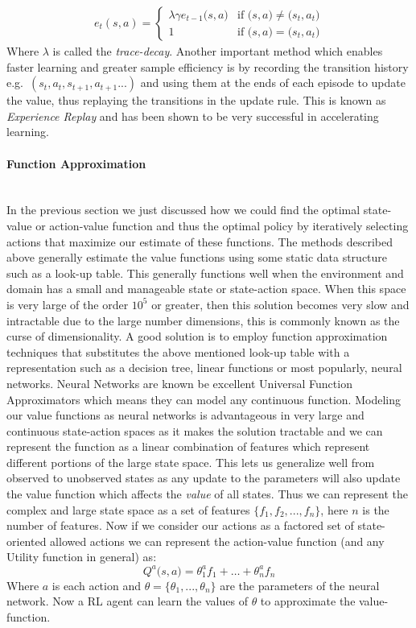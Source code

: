 \documentclass[14pt]{extarticle}
\newcommand{\myparagraph}[1]{\paragraph{#1}\mbox{}\\ \linebreak}
\numberwithin{equation}{section}
\begin{document}
	\begin{align}
	e_t(s,a) = \begin{cases}
	\lambda\gamma e_{t-1}\big(s,a\big) & \text{if }\big(s,a\big) \neq \big(s_t,a_t\big) \\    
	1 & \text{if }\big(s,a\big) = \big(s_t,a_t\big)
	\end{cases}
	\end{align}
	Where $\lambda$ is called the \textit{trace-decay}.
	Another important method which enables faster learning and greater sample efficiency is by recording the transition history e.g.\ $(s_t,a_t,s_{t+1},a_{t+1}...)$ and using them at the ends of each episode to update the value, thus replaying the transitions in the update rule. This is known as \textit{Experience Replay} and has been shown to be very successful in accelerating learning\cite{adam2012experience}.
	
	\myparagraph{Function Approximation} \label{fn_aprrox}
	In the previous section we just discussed how we could find the optimal state-value or action-value function and thus the optimal policy by iteratively selecting actions that maximize our estimate of these functions.  The methods described above generally estimate the value functions using some static data structure such as a look-up table. This generally functions well when the environment and domain has a small and manageable state or state-action space.  When this space is very large of the order $10^5$ or greater, then this solution becomes very slow and intractable due to the large number dimensions, this is commonly known as the curse of dimensionality\cite{verleysen2005curse}. A good solution is to employ function approximation techniques that substitutes the above mentioned look-up table with a representation such as a decision tree, linear functions or most popularly, neural networks. Neural Networks are known be excellent Universal Function Approximators \cite{hornik1989multilayer} which means they can model any continuous function. Modeling our value functions as neural networks is advantageous in very large and continuous state-action spaces as it makes the solution tractable and we can represent the function as a linear combination of features which represent different portions of the large state space. This lets us generalize well from observed to unobserved states as any update to the parameters will also update the value function which affects the \textit{value} of all states. Thus we can represent the complex and large state space as a set of features $\{f_1,f_2,...,f_n\}$, here $n$ is the number of features. Now if we consider our actions as a factored set of state-oriented allowed actions we can represent the action-value function (and any Utility function in general) as: 
	\begin{equation}
	Q^a\big(s,a\big) = {\theta_1^a}f_1+\dots+{\theta_n^a}f_n
	\end{equation}		
	Where $a$ is each action and $\theta = \{\theta_1,...,\theta_n\}$ are the parameters of the neural network. Now a RL agent can learn the values of $\theta$ to approximate the value-function. 
	
\end{document}
